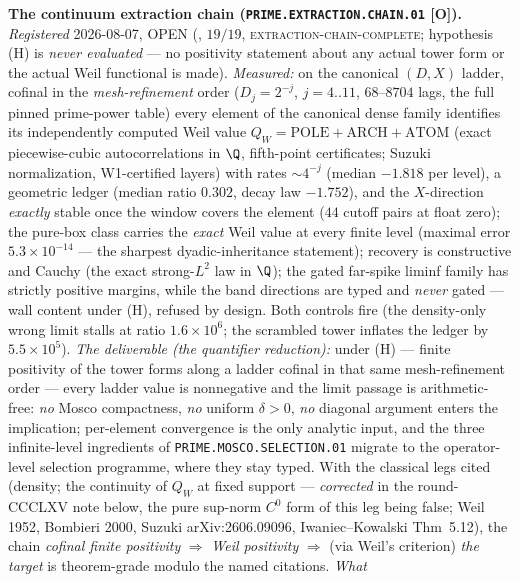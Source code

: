 \documentclass[11pt,a4paper]{article}
\begin{document}
\par\smallskip\noindent\textbf{The continuum extraction chain
(\texttt{PRIME.EXTRACTION.CHAIN.01} [O]).}
{\sloppy
\emph{Registered} 2026-08-07, OPEN
(, $19/19$,
\textsc{extraction-chain-complete}; hypothesis (H) is \emph{never
evaluated} --- no positivity statement about any actual tower
form or the actual Weil functional is made).  \emph{Measured:} on
the canonical $(D, X)$ ladder, cofinal in the
\emph{mesh-refinement} order ($D_j = 2^{-j}$,
$j = 4..11$, $68$--$8704$ lags, the full pinned prime-power
table) every element of the canonical dense family identifies its
independently computed Weil value $Q_W = \mathrm{POLE} +
\mathrm{ARCH} + \mathrm{ATOM}$ (exact piecewise-cubic
autocorrelations in $\Q$, fifth-point certificates; Suzuki
normalization, W1-certified layers) with rates ${\sim}4^{-j}$
(median $-1.818$ per level), a geometric ledger (median ratio
$0.302$, decay law $-1.752$), and the $X$-direction \emph{exactly}
stable once the window covers the element ($44$ cutoff pairs at
float zero); the pure-box class carries the \emph{exact} Weil
value at every finite level (maximal error $5.3\times10^{-14}$
--- the sharpest dyadic-inheritance statement); recovery is
constructive and Cauchy (the exact strong-$L^2$ law in $\Q$);
the gated far-spike liminf family has strictly positive margins,
while the band directions are typed and \emph{never} gated ---
wall content under (H), refused by design.  Both controls fire
(the density-only wrong limit stalls at ratio $1.6\times10^6$;
the scrambled tower inflates the ledger by $5.5\times10^5$).
\emph{The deliverable (the quantifier reduction):} under (H) ---
finite positivity of the tower forms along a ladder cofinal in
that same mesh-refinement order --- every ladder
value is nonnegative and the limit passage is arithmetic-free:
\emph{no} Mosco compactness, \emph{no} uniform $\delta > 0$,
\emph{no} diagonal argument enters the implication; per-element
convergence is the only analytic input, and the three
infinite-level ingredients of \texttt{PRIME.MOSCO.SELECTION.01}
migrate to the operator-level selection programme, where they
stay typed.  With the classical legs cited (density; the
continuity of $Q_W$ at fixed support --- \emph{corrected} in the
round-CCCLXV note below, the pure sup-norm $C^0$ form of this
leg being false; Weil 1952, Bombieri
2000, Suzuki arXiv:2606.09096, Iwaniec--Kowalski Thm~5.12), the
chain \emph{cofinal finite positivity} $\Rightarrow$ \emph{Weil
positivity} $\Rightarrow$ (via Weil's criterion) \emph{the
target} is theorem-grade modulo the named citations.  \emph{What
}}
\end{document}
